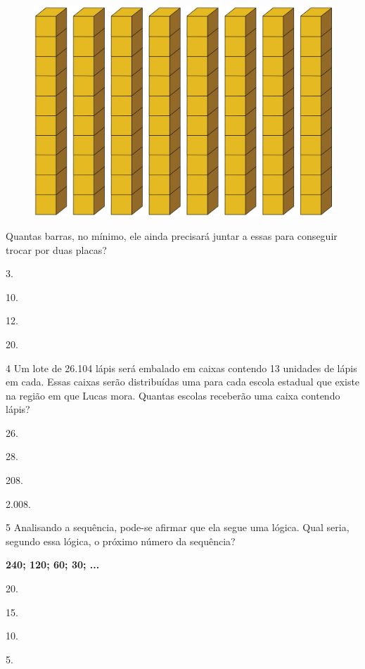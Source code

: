 \begin{figure}[htpb!]
\centering
\includegraphics[width=.5\textwidth]{./media/image103.png}
\end{figure}

Quantas barras, no mínimo, ele ainda precisará juntar a essas para conseguir trocar por duas placas?

\begin{escolha}
\item
  3.
\item
  10.
\item
  12.
\item
  20.
\end{escolha}

\num{4} Um lote de 26.104 lápis será embalado em caixas contendo 13 unidades de
lápis em cada. Essas caixas serão distribuídas uma para cada escola
estadual que existe na região em que Lucas mora. Quantas escolas
receberão uma caixa contendo lápis?

\begin{escolha}
\item
  26.
\item
  28.
\item
  208.
\item
  2.008.
\end{escolha}

\num{5} Analisando a sequência, pode-se afirmar que ela segue uma lógica. Qual seria, segundo essa lógica, o próximo número da sequência?

\begin{myquote}
\centering
\textbf{240; 120; 60; 30; ...}
\end{myquote}

\begin{multicols}{2}
\begin{escolha}
\item
  20.
\item
  15.
\item
  10.
\item
  5.
\end{escolha}
\end{multicols}


